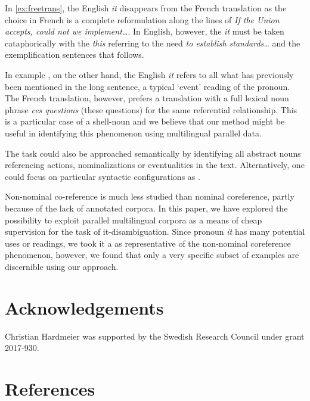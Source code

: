 \documentclass[10pt, a4paper]{article}
\begin{document}
In \ref{ex:freetrans}, the English \textit{it} disappears from the 
French translation as the choice in French is a complete reformulation along the 
lines of \textit{If the Union accepts, could not we implement\ldots}. In 
English, however, the \textit{it} must be taken cataphorically with the 
\textit{this} referring to the need \textit{to establish standards\ldots} and 
the exemplification sentences that follows. 

In example \label{ex:shellnoun}, on the other hand, the English \textit{it} 
refers to all what has previously been mentioned in the long sentence, a typical 
`event' reading of the pronoun. The French translation, however, prefers a 
translation with a full lexical noun phrase \textit{ces questions} (these 
questions) for the same referential 
relationship. This is a particular case of a shell-noun 
\cite{kolhatkar-etal-2013-interpreting} and we believe that our method might be useful in identifying this phenomenon using multilingual parallel data. 

The task could also be approached semantically by identifying all abstract
nouns referencing actions, nominalizations or eventualities in the text. Alternatively, one could focus on particular syntactic configurations as
.

Non-nominal co-reference is much less studied than nominal coreference, partly
because of the lack of annotated corpora. In this paper, we have explored the
possibility to exploit parallel multilingual corpora as a means of cheap
supervision for the task of it-disambiguation. Since pronoun \textit{it} has many
potential uses or readings, we took it a as representative of the non-nominal
coreference phenomenon, however, we found that only a very specific subset of examples are discernible using our approach. 

%
%
%
\section{Acknowledgements}
Christian Hardmeier was supported by the Swedish Research Council under grant 2017-930.
%
%
\section{References}

 


\end{document}
